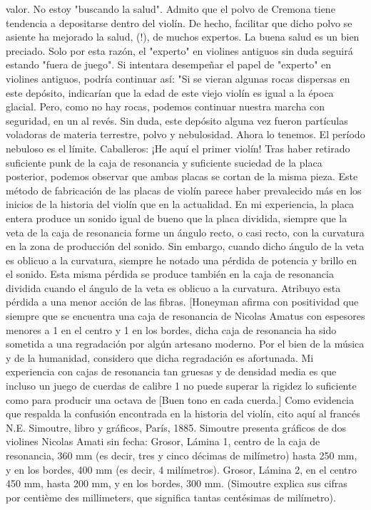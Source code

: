 valor. No estoy "buscando la salud". Admito que el polvo de Cremona tiene tendencia a depositarse dentro del violín. De hecho, facilitar que dicho polvo se asiente ha mejorado la salud, (!), de muchos expertos. La buena salud es un bien preciado. Solo por esta razón, el "experto" en violines antiguos sin duda seguirá estando "fuera de juego".
Si intentara desempeñar el papel de "experto" en violines antiguos, podría continuar así: "Si se vieran algunas rocas dispersas en este depósito, indicarían que la edad de este viejo violín es igual a la época glacial. Pero, como no hay rocas, podemos continuar nuestra marcha con seguridad, en un
al revés. Sin duda, este depósito alguna vez fueron partículas voladoras de materia terrestre, polvo y nebulosidad. Ahora lo tenemos. El período nebuloso es el
límite.
Caballeros: ¡He aquí el primer violín!
Tras haber retirado suficiente punk de la caja de resonancia y suficiente suciedad de la placa posterior, podemos observar que ambas placas se cortan de la misma pieza. Este método de fabricación de las placas de violín parece haber prevalecido más en los inicios de la historia del violín que en la actualidad. En mi experiencia, la placa entera produce un sonido igual de bueno que la placa dividida, siempre que la veta de la caja de resonancia forme un ángulo recto, o casi recto, con la curvatura en la zona de producción del sonido. Sin embargo, cuando dicho ángulo de la veta es oblicuo a la curvatura, siempre he notado una pérdida de potencia y brillo en el sonido. Esta misma pérdida se produce también en la caja de resonancia dividida cuando el ángulo de la veta es oblicuo a la curvatura. Atribuyo esta pérdida a una menor acción de las fibras.
[Honeyman afirma con positividad que siempre que se encuentra una caja de resonancia de Nicolas Amatus con espesores menores a 1 en el centro y 1 en los bordes, dicha caja de resonancia ha sido sometida a una regradación por algún artesano moderno. Por el bien de la música y de la humanidad, considero que dicha regradación es afortunada. Mi experiencia con cajas de resonancia tan gruesas y de densidad media es que incluso un juego de cuerdas de calibre 1 no puede superar la rigidez lo suficiente como para producir una octava de
[Buen tono en cada cuerda.] Como evidencia que respalda la confusión encontrada en la historia del violín, cito aquí al francés N.E. Simoutre, libro y gráficos, París, 1885. Simoutre presenta gráficos de dos violines Nicolas Amati sin fecha: Grosor, Lámina 1, centro de la caja de resonancia, 360 mm (es decir, tres y cinco décimas de milímetro) hasta 250 mm, y en los bordes, 400 mm (es decir, 4 milímetros). Grosor, Lámina 2, en el centro 450 mm, hasta 200 mm, y en los bordes, 300 mm. (Simoutre explica sus cifras por centième des millimeters, que significa tantas centésimas de milímetro).
